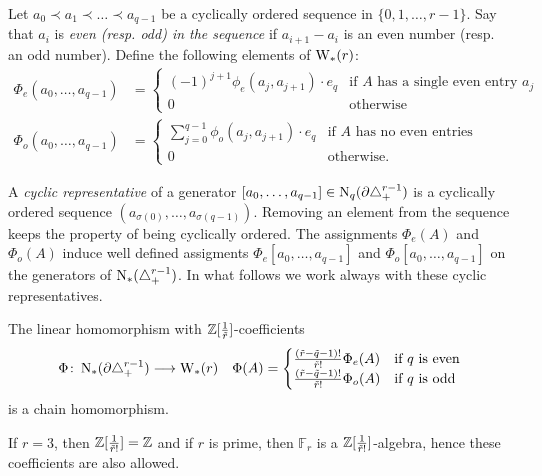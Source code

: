 Let $a_0\prec a_1\prec\ldots\prec a_{q-1}$ be a cyclically ordered sequence in $\{0,1,\ldots,r-1\}$. Say that $a_i$ is \emph{even (resp. \emph{odd}) in the sequence} if $a_{i+1}-a_i$ is an even number (resp. an odd number).
Define the following elements of $\mathrm{W}_*(r)$:
\begin{align*}
	\Phi_e(a_0,\ldots,a_{q-1}) &= \begin{cases}
		(-1)^{j+1}\phi_e(a_j,a_{j+1})\cdot e_q & \text{if $A$ has a single even entry $a_j$} \\
		0 & \text{otherwise}
	\end{cases}
	\\
	\Phi_o(a_0,\ldots,a_{q-1}) &= \begin{cases}
		\sum_{j=0}^{q-1} \phi_o(a_j,a_{j+1})\cdot e_q & \text{if $A$ has no even entries} \\
		0 & \text{otherwise.}
	\end{cases}
\end{align*}

A \emph{cyclic representative} of a generator $[a_0,\ldots,a_{q-1}]\in \operatorname{N}_q(\partial \triangle_{+}^{r-1})$ is a cyclically ordered sequence $(a_{\sigma(0)},\ldots,a_{\sigma(q-1)})$. Removing an element from the sequence keeps the property of being cyclically ordered. The assignments $\Phi_e(A)$ and $\Phi_o(A)$ induce well defined assigments $\Phi_e[a_0,\ldots,a_{q-1}]$ and $\Phi_o[a_0,\ldots,a_{q-1}]$ on the generators of $\operatorname{N}_*(\triangle_{+}^{r-1})$. In what follows we work always with these cyclic representatives.
\begin{theorem} The linear homomorphism with $\mathbb{Z}[\frac{1}{\tilde{r}}]$-coefficients
	\begin{align*}
		\Phi\colon \operatorname{N}_*(\partial \triangle_{+}^{r-1})&\longrightarrow \mathrm{W}_*(r)
		&
		\Phi(A) = \begin{cases}
			\frac{(\tilde{r}-\tilde{q}-1)!}{\tilde{r}!}\Phi_e(A) & \text{if $q$ is even} \\
			\frac{(\tilde{r}-\tilde{q}-1)!}{\tilde{r}!}\Phi_o(A) & \text{if $q$ is odd}
		\end{cases}
	\end{align*}
	is a chain homomorphism.
\end{theorem}

\begin{remark}
	If $r=3$, then $\mathbb{Z}[\frac{1}{\tilde{r}!}] = \mathbb{Z}$ and if $r$ is prime, then $\mathbb{F}_r$ is a $\mathbb{Z}[\frac{1}{\tilde{r}!}]$-algebra, hence these coefficients are also allowed.
\end{remark}

